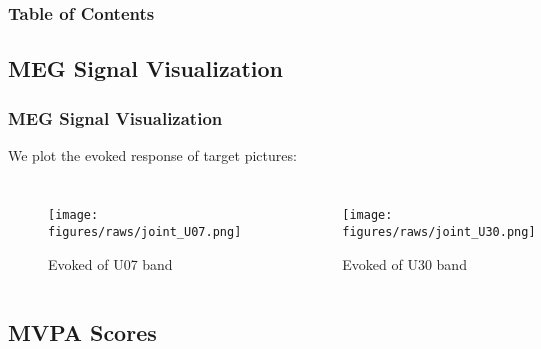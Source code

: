 \documentclass[aspectratio=169]{beamer}
\begin{document}
\begin{frame}[plain]
    \frametitle{Table of Contents}
\end{frame}

\subsection{MEG Signal Visualization}

\begin{frame}
    \frametitle{MEG Signal Visualization}
    We plot the evoked response of target pictures:

    \begin{columns}

        \begin{figure}[h]
            \centering
            \texttt{[image: figures/raws/joint\_U07.png]}
            \caption{Evoked of U07 band}
        \end{figure}


        \begin{figure}[!h]
            \centering
            \texttt{[image: figures/raws/joint\_U30.png]}
            \caption{Evoked of U30 band}
        \end{figure}

    \end{columns}

\end{frame}

\subsection{MVPA Scores}
\end{document}
